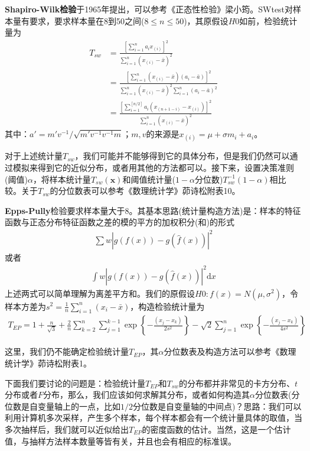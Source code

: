         \par
        \textbf{Shapiro-Wilk检验}于1965年提出，可以参考《正态性检验》梁小筠。SWtest对样本量有要求，要求样本量在8到50之间($8 \leqslant n \leqslant50$)，其原假设$H0$如前，检验统计量为
        \begin{align*}
        T_{sw} &= \frac{\left[\sum\limits_{i = 1}^na_ix_{(i)}\right]^2}{\sum\limits_{i=1}^n(x_{(i)}-\bar{x})^2} \\
        &=\frac{\left[\sum\limits_{i=1}^n(x_{(i)} - \bar{x})(a_i-\bar{a})\right]^2}{\sum\limits_{i=1}^n(x_{(i)}-\bar{x})^2\sum\limits_{i=1}^n(a_{i}-\bar{a})^2} \\
        &=\frac{\left[ \sum\limits_{i=1}^{[n/2]} a_i(x_{(n+1-i)} - x_{(i)})\right]^2}{\sum\limits_{i=1}^n(x_{(i)} - \bar{x})^2}
        \end{align*}
        其中：$a' = m'v^{-1}/\sqrt{m'v^{-1}v^{-1}m}$；$m,v$的来源是$x_{(i)} = \mu+\sigma m_i +a_i$。
        \par
        对于上述统计量$T_{sw}$，我们可能并不能够得到它的具体分布，但是我们仍然可以通过模拟来得到它的近似分布，或者用其他的方法都可以。接下来，设置决策准则(阈值)$\alpha$，将样本统计量$T_{sw}(\mathbf{x})$和阈值统计量($1-\alpha$分位数)$T_{sw}^{-1}(1-\alpha)$相比较。关于$T_{sw}$的分位数表可以参考《数理统计学》茆诗松附表10。
        \par
        \textbf{Epps-Pully}检验要求样本量大于8。其基本思路(统计量构造方法)是：样本的特征函数与正态分布特征函数之差的模的平方的加权积分(和)的形式
        \begin{align*}
        \sum w\left|g(f(x))- g(\hat{f}(x))\right|^2
        \end{align*}
        或者
        \begin{align*}
        \int w \left|g(f(x))- g(\hat{f}(x))\right|^2\mathrm{d}x
        \end{align*}
        上述两式可以简单理解为离差平方和。我们的原假设$H0:f(x) = N(\mu,\sigma^2)$，令样本方差为$s^2 = \frac{1}{n}\sum_{i = 1}^n(x_i - \bar{x})$，构造检验统计量为
        \begin{align*}
        T_{EP} = 1+\frac{n}{\sqrt{3}}+ \frac{2}{n}\sum_{k=2}^n\sum_{j=1}^{k-1}\exp\left\{-\frac{(x_j-x_k)}{2s^2}\right\} - \sqrt{2}\sum_{j=1}^n\exp\left\{ -\frac{(x_j-x_k)}{4s^2} \right\}
        \end{align*}
        \par
        这里，我们仍不能确定检验统计量$T_{EP}$，其$\alpha$分位数表及构造方法可以参考《数理统计学》茆诗松附表1。
        \par
        下面我们要讨论的问题是：检验统计量$T_{EP}$和$T_{sw}$的分布都并非常见的卡方分布、$t$分布或者$F$分布，那么，我们应该如何求解其分布，或者如何构造其$\alpha$分位数表(分位数是自变量轴上的一点，比如$1/2$分位数是自变量轴的中间点)？思路：我们可以利用计算机多次采样，产生多个样本，每个样本都会有一个统计量具体的取值，当多次抽样后，我们就可以近似给出$T_{EP}$的密度函数的估计。当然，这是一个估计值，与抽样方法样本数量等皆有关，并且也会有相应的标准误。
